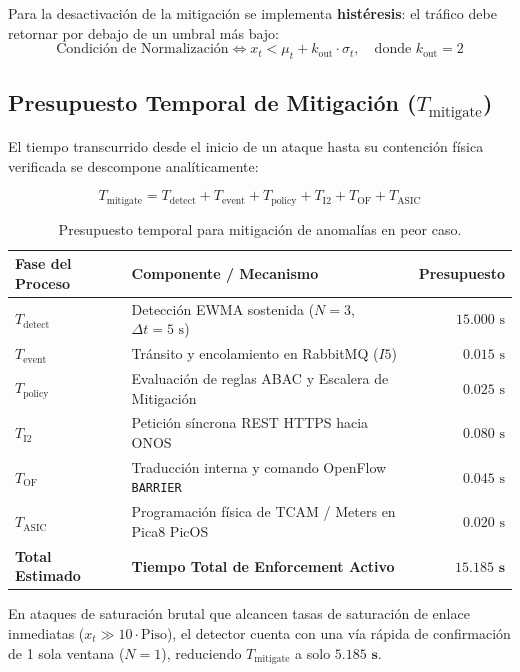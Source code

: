 \documentclass[11pt,a4paper]{report}
\begin{document}
Para la desactivación de la mitigación se implementa \textbf{histéresis}: el tráfico debe retornar por debajo de un umbral más bajo:
\begin{equation}
\text{Condición de Normalización} \iff x_t < \mu_t + k_{\text{out}} \cdot \sigma_t, \quad \text{donde } k_{\text{out}} = 2
\end{equation}

\subsection{Presupuesto Temporal de Mitigación ($T_{\text{mitigate}}$)}
El tiempo transcurrido desde el inicio de un ataque hasta su contención física verificada se descompone analíticamente:

\begin{equation}
T_{\text{mitigate}} = T_{\text{detect}} + T_{\text{event}} + T_{\text{policy}} + T_{\text{I2}} + T_{\text{OF}} + T_{\text{ASIC}}
\end{equation}

\begin{table}[h!]
\centering
\small
\begin{tabular}{llr}
\toprule
\textbf{Fase del Proceso} & \textbf{Componente / Mecanismo} & \textbf{Presupuesto} \\
\midrule
$T_{\text{detect}}$ & Detección EWMA sostenida ($N=3$, $\Delta t=5\text{ s}$) & $15.000\text{ s}$ \\
$T_{\text{event}}$ & Tránsito y encolamiento en RabbitMQ ($I5$) & $0.015\text{ s}$ \\
$T_{\text{policy}}$ & Evaluación de reglas ABAC y Escalera de Mitigación & $0.025\text{ s}$ \\
$T_{\text{I2}}$ & Petición síncrona REST HTTPS hacia ONOS & $0.080\text{ s}$ \\
$T_{\text{OF}}$ & Traducción interna y comando OpenFlow \texttt{BARRIER} & $0.045\text{ s}$ \\
$T_{\text{ASIC}}$ & Programación física de TCAM / Meters en Pica8 PicOS & $0.020\text{ s}$ \\
\midrule
\textbf{Total Estimado} & \textbf{Tiempo Total de Enforcement Activo} & $\mathbf{15.185\text{ s}}$ \\
\bottomrule
\end{tabular}
\caption{Presupuesto temporal para mitigación de anomalías en peor caso.}
\label{tab:tiempos}
\end{table}

En ataques de saturación brutal que alcancen tasas de saturación de enlace inmediatas ($x_t \gg 10 \cdot \text{Piso}$), el detector cuenta con una vía rápida de confirmación de 1 sola ventana ($N=1$), reduciendo $T_{\text{mitigate}}$ a solo $\mathbf{5.185\text{ s}}$.
\end{document}
